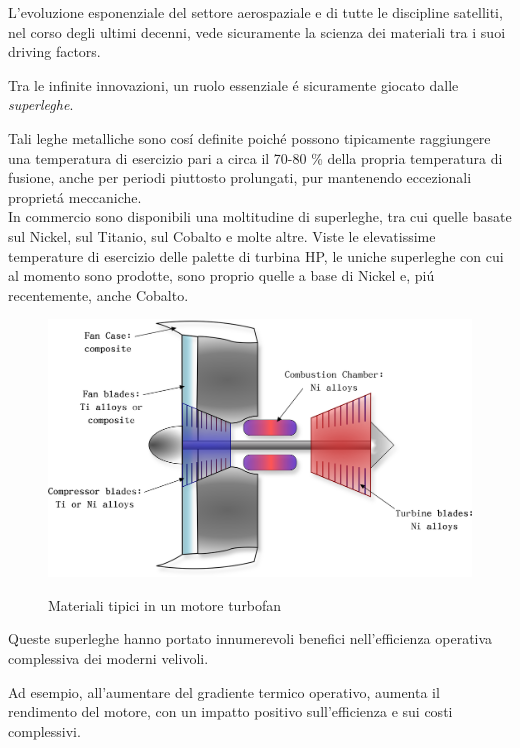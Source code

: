 \documentclass{article}
\begin{document}
    L'evoluzione esponenziale del settore aerospaziale e di tutte le discipline satelliti, 
    nel corso degli ultimi decenni, vede sicuramente la scienza dei materiali 
    tra i suoi driving factors.

    Tra le infinite innovazioni, un ruolo essenziale é sicuramente giocato dalle \textit{superleghe}.

    Tali leghe metalliche sono cosí definite poiché possono tipicamente raggiungere
    una temperatura di esercizio pari a circa il 70-80 \% della propria temperatura di 
    fusione, anche per periodi piuttosto prolungati, pur mantenendo eccezionali
    proprietá meccaniche.
    \\ 

    In commercio sono disponibili una moltitudine di superleghe, tra cui quelle basate 
    sul Nickel, sul Titanio, sul Cobalto e molte altre.
    Viste le elevatissime temperature di esercizio delle palette di turbina HP, le
    uniche superleghe con cui al momento sono prodotte, sono proprio quelle a base di Nickel
    e, piú recentemente, anche Cobalto. 
    
    \begin{figure}[h!]
        \centering
         \label{turbofan_drawing}
        \includegraphics[width=0.9 \textwidth]{Sources/engine_drawing.eps}
        \caption{Materiali tipici in un motore turbofan \autocite{Inkscape}}
    \end{figure}

    Queste superleghe hanno portato innumerevoli benefici nell'efficienza operativa
    complessiva dei moderni velivoli.

    Ad esempio, all'aumentare del gradiente termico operativo, aumenta il rendimento del motore, 
    con un impatto positivo sull'efficienza e sui costi complessivi.
\end{document}
